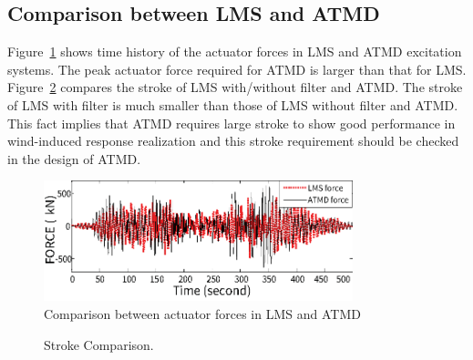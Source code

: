 \subsection{Comparison between LMS and ATMD}

Figure~\ref{fig:6-14} shows time history of the actuator forces in LMS and ATMD excitation systems. The peak actuator force required for ATMD is larger than that for LMS. Figure~\ref{fig:6-15} compares the stroke of LMS with/without filter and ATMD. The stroke of LMS with filter is much smaller than those of LMS without filter and ATMD. This fact implies that ATMD requires large stroke to show good performance in wind-induced response realization and this stroke requirement should be checked in the design of ATMD.

\begin{figure}[ht]
\centering
\includegraphics[width=0.8\textwidth] {figure/6-14.eps}
\caption{Comparison between actuator forces in LMS and ATMD}
\label{fig:6-14}
\end{figure}

\begin{figure}[!ht]
\centering
{}
\caption{Stroke Comparison.}
\label{fig:6-15}
\end{figure}

